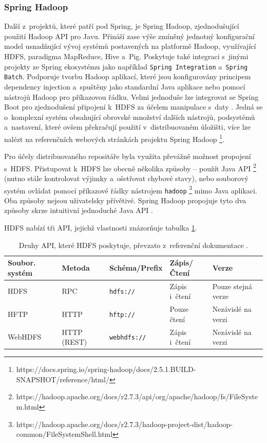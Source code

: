 \subsubsection{Spring Hadoop}
Další z~projektů, které patří pod Spring, je Spring Hadoop, zjednodušující použití Hadoop API pro Javu. Přináší zase výše zmíněný jednotný konfigurační model usnadňující vývoj systémů postavených na platformě Hadoop, využívající HDFS, paradigma MapReduce, Hive a~Pig. Poskytuje také integraci s~jinými projekty ze Spring ekosystému jako například \texttt{Spring Integration} a~\texttt{Spring Batch}. Podporuje tvorbu Hadoop aplikací, které jsou konfigurovány principem dependency injection a~spuštěny jako standardní Java aplikace nebo pomocí nástrojů Hadoop pro příkazovou řádku.
Velmi jednoduše lze integrovat se Spring Boot pro zjednodušení připojení k~HDFS za účelem manipulace s~daty \cite{springHadoop}. Jedná se o~komplexní systém obsahující obrovské množství dalších nástrojů, podsystémů a~nastavení, které ovšem překračují použití v~distribuovaném úložišti, více lze nalézt na referenčních webových stránkách projektu Spring Hadoop \footnote{https://docs.spring.io/spring-hadoop/docs/2.5.1.BUILD-SNAPSHOT/reference/html/}.

Pro účely distribuovaného repositáře byla využita převážně možnost propojení s~HDFS. Přistupovat k~HDFS lze obecně několika způsoby -- použít Java API \footnote{https://hadoop.apache.org/docs/r2.7.3/api/org/apache/hadoop/fs/FileSystem.html} (nutno stále kontrolovat výjimky a~ošetřovat chybové stavy), nebo souborový systém ovládat pomocí příkazové řádky nástrojem \texttt{hadoop} \footnote{https://hadoop.apache.org/docs/r2.7.3/hadoop-project-dist/hadoop-common/FileSystemShell.html} mimo Java aplikaci. Oba způsoby nejsou uživatelsky přívětivé. Spring Hadoop propojuje tyto dva způsoby skrze intuitivní jednoduché Java API \cite{springHadoopReference}.

HDFS nabízí tři API, jejichž vlastnosti znázorňuje tabulka \ref{HDFSApi}.
\begin{table}[h!]
    \centering
    \begin{tabular}{| l | l | l | l | l |}
    \hline
    Soubor. systém   &   Metoda   &   Schéma/Prefix &  Zápis/Čtení &   Verze \\ \hline
    HDFS & RPC & \texttt{hdfs://} & Zápis i~čtení & Pouze stejná verze \\ \hline
    HFTP & HTTP & \texttt{hftp://} & Pouze čtení & Nezávislé na verzi \\ \hline
    WebHDFS & HTTP (REST) & \texttt{webhdfs://} & Zápis i~čtení & Nezávislé na verzi \\ \hline
    \end{tabular}\par
    \bigskip
    \caption{Druhy API, které HDFS poskytuje, převzato z~referenční dokumentace \cite{springHadoopReference}.}
    \label{HDFSApi}
\end{table}

